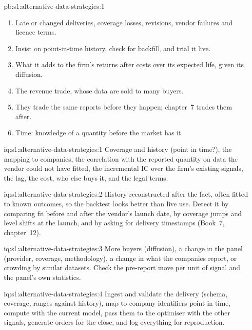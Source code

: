 \begin{solution}{pb:s1:alternative-data-strategies:1}
\begin{enumerate}
\item Late or changed deliveries, coverage losses, revisions, vendor failures and licence terms.
\item Insist on point-in-time history, check for backfill, and trial it live.
\item What it adds to the firm's returns after costs over its expected life, given its diffusion.
\item The revenue  trade, whose data are sold to many buyers.
\item They trade the same reports before they happen; chapter~7 trades them after.
\item Time: knowledge of a quantity before the market has it.
\end{enumerate}
\end{solution}

\begin{solution}{iq:s1:alternative-data-strategies:1}
Coverage and history (point in time?), the mapping to companies, the correlation with the reported quantity on data the vendor could not have fitted, the
incremental IC over the firm's existing signals, the lag, the cost, who else buys it, and the legal terms.
\end{solution}

\begin{solution}{iq:s1:alternative-data-strategies:2}
History reconstructed after the fact, often fitted to known outcomes, so the backtest looks better than live use. Detect it by comparing fit before and
after the vendor's launch date, by coverage jumps and level shifts at the launch, and by asking for delivery timestamps (Book~7, chapter~12).
\end{solution}

\begin{solution}{iq:s1:alternative-data-strategies:3}
More buyers (diffusion), a change in the panel (provider, coverage, methodology), a change in what the companies report, or crowding by similar datasets.
Check the pre-report move per unit of signal and the panel's own statistics.
\end{solution}

\begin{solution}{iq:s1:alternative-data-strategies:4}
Ingest and validate the delivery (schema, coverage, ranges against history), map to company identifiers point in time, compute  with the current
model, pass them to the optimiser with the other signals, generate orders for the close, and log everything for reproduction.
\end{solution}

